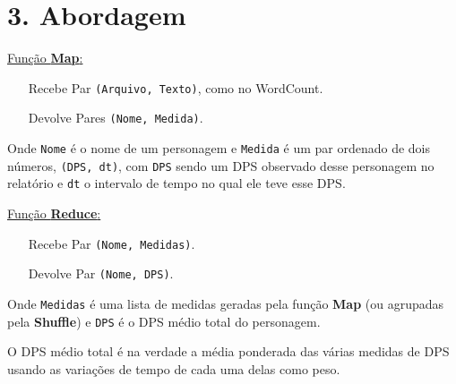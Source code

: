 \documentclass[brazil]{beamer}
\begin{document}

\section{3. Abordagem}


\begin{frame}[fragile]
  \underline{\Large Função \textbf{Map}:}
  
  \vspace{4pt}
  \begin{itemize}
    \pause
    \item[Recebe] Par \verb$(Arquivo, Texto)$, como no WordCount.
    \pause
    \item[Devolve] Pares \verb$(Nome, Medida)$.
  \end{itemize}
  \pause
  \hspace{10pt}
  Onde \verb$Nome$ é o nome de um personagem e \verb$Medida$ é um par ordenado
  de dois números, \verb$(DPS, dt)$, com \verb$DPS$ sendo um DPS observado desse
  personagem no relatório e \verb$dt$ o intervalo de tempo no qual ele teve esse
  DPS.
\end{frame}

\begin{frame}[fragile]
  \underline{\Large Função \textbf{Reduce}:}
  
  \vspace{4pt}
  \begin{itemize}
    \pause
    \item[Recebe] Par \verb$(Nome, Medidas)$.
    \pause
    \item[Devolve] Par \verb$(Nome, DPS)$.
  \end{itemize}
  \pause
  \hspace{10pt}
  Onde \verb$Medidas$ é uma lista de medidas geradas pela função \textbf{Map}
  (ou agrupadas pela \textbf{Shuffle}) e \verb$DPS$ é o DPS médio total do
  personagem.
  
  \pause
  \hspace{10pt}
  O DPS médio total é na verdade a média ponderada das várias medidas de DPS
  usando as variações de tempo de cada uma delas como peso.
\end{frame}
\end{document}
